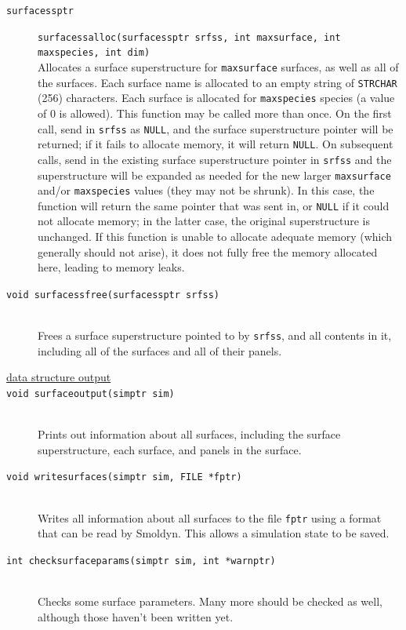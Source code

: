 \documentclass {scrbook}
\newcommand {\ttt} {\texttt}
\begin{document}
\begin{description}
\item[\ttt{surfacessptr}]
\ttt{surfacessalloc(surfacessptr srfss, int maxsurface, int maxspecies, int dim)}
\hfill \\
Allocates a surface superstructure for \ttt{maxsurface} surfaces, as well as all of the surfaces. Each surface name is allocated to an empty string of \ttt{STRCHAR} (256) characters. Each surface is allocated for \ttt{maxspecies} species (a value of 0 is allowed). This function may be called more than once. On the first call, send in \ttt{srfss} as \ttt{NULL}, and the surface superstructure pointer will be returned; if it fails to allocate memory, it will return \ttt{NULL}. On subsequent calls, send in the existing surface superstructure pointer in \ttt{srfss} and the superstructure will be expanded as needed for the new larger \ttt{maxsurface} and/or \ttt{maxspecies} values (they may not be shrunk). In this case, the function will return the same pointer that was sent in, or \ttt{NULL} if it could not allocate memory; in the latter case, the original superstructure is unchanged. If this function is unable to allocate adequate memory (which generally should not arise), it does not fully free the memory allocated here, leading to memory leaks.

\item[\ttt{void surfacessfree(surfacessptr srfss)}]
\hfill \\
Frees a surface superstructure pointed to by \ttt{srfss}, and all contents in it, including all of the surfaces and all of their panels.

\item[\underline{data structure output}]

\item[\ttt{void surfaceoutput(simptr sim)}]
\hfill \\
Prints out information about all surfaces, including the surface superstructure, each surface, and panels in the surface.

\item[\ttt{void writesurfaces(simptr sim, FILE *fptr)}]
\hfill \\
Writes all information about all surfaces to the file \ttt{fptr} using a format that can be read by Smoldyn. This allows a simulation state to be saved.

\item[\ttt{int checksurfaceparams(simptr sim, int *warnptr)}]
\hfill \\
Checks some surface parameters. Many more should be checked as well, although those haven't been written yet.


\end{description}
\end{document}
